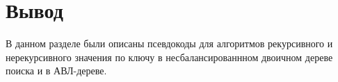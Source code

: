 \section*{Вывод}

В данном разделе были описаны псевдокоды для алгоритмов рекурсивного и нерекурсивного значения по ключу в несбалансированнном двоичном дереве поиска и в АВЛ-дереве.



